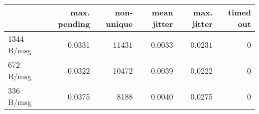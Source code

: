 \begin{tabular}{l|rrrrr}
\rowcolor{gray!50}
 & max. pending & non-unique & mean jitter & max. jitter & timed out\\\hline
1344 B/msg & 0.0331 & 11431 & 0.0033 & 0.0231 & 0 \\
672 B/msg & 0.0322 & 10472 & 0.0039 & 0.0222 & 0 \\
336 B/msg & 0.0375 & 8188 & 0.0040 & 0.0275 & 0 \\
\end{tabular}
